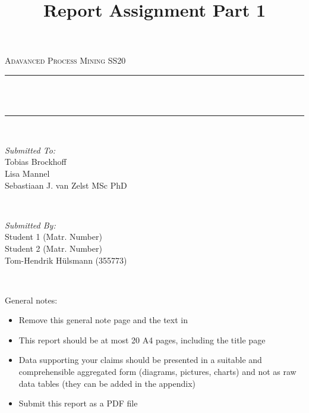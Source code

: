 \documentclass[12pt]{report}
\title{Report Assignment Part 1}
\author{}
\date{}
\makeatletter
\let\thetitle\@title
\makeatother
\begin{document}

\begin{titlepage}
	\centering
    \vspace*{0.5 cm}
  \begin{center}    \textsc{\Large   Adavanced Process Mining SS20}\\[2.0 cm]	\end{center}
	\rule{\linewidth}{0.2 mm} \\[0.4 cm]
	{ \huge \bfseries \thetitle}\\
	\rule{\linewidth}{0.2 mm} \\[1.5 cm]
	
  \begin{minipage}{0.48\textwidth}
    \begin{flushleft} \large
      \emph{Submitted To:}\\
      Tobias Brockhoff\\
      Lisa Mannel\\
      Sebastiaan J. van Zelst MSc PhD\\
    \end{flushleft}
  \end{minipage}~
  \begin{minipage}{0.48\textwidth}
    \begin{flushright} \large
			\emph{Submitted By:} \\
      Student 1 (Matr. Number) \\
      Student 2 (Matr. Number)  \\
      Tom-Hendrik Hülsmann (355773)
		\end{flushright}
	\end{minipage}\\[2 cm]
	
\end{titlepage}


\renewcommand{\thesection}{\arabic{section}}
General notes:
\begin{itemize}
  \item Remove this general note page and the text in \textlangle \textrangle
  \item This report should be at most 20 A4 pages, including the title page 
  \item	Data supporting your claims should be presented in a suitable and comprehensible aggregated form (diagrams, pictures, charts) and not as raw data tables (they can be added in the appendix)
  \item Submit this report as a PDF file
\end{itemize}
\newpage
\end{document}
